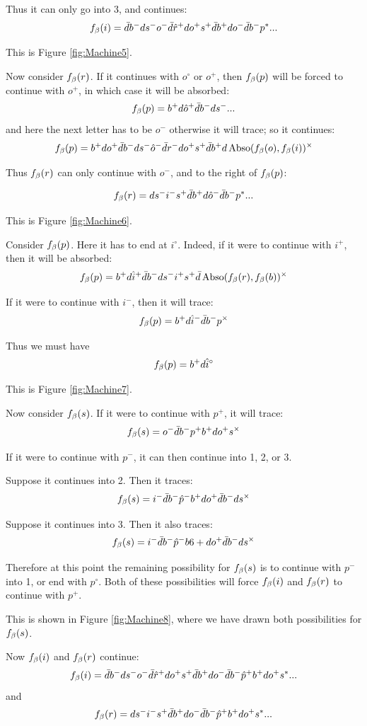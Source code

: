 Thus it can only go into 3, and continues:
\[
f_\beta(i) = \bar{d} b^- d s^- o^- \bar{d} \hat{r}^+ d o^+ s^+ \bar{d} b^+ d o^- \bar{d} b^- p^*...
\]

This is Figure \ref{fig:Machine5}.

Now consider $f_\beta(r)$. If it continues with $o^\circ$ or $o^+$, then $f_\beta(p)$ will be forced to continue with $o^+$, in which case it will be absorbed:
\[
f_\beta(p) = b^+ d \hat{o}^+ \bar{d} b^- d s^-...
\]
and here the next letter has to be $o^-$ otherwise it will trace; so it continues:
\[
f_\beta(p) = b^+ d o^+ \bar{d} b^- d s^- \hat{o}^- \bar{d} r^- d o^+ s^+ \bar{d} b^+ d \operatorname{Abso}(f_\beta(o), f_\beta(i))^\times
\]

Thus $f_\beta(r)$ can only continue with $o^-$, and to the right of $f_\beta(p)$:

\[
f_\beta(r) = d s^- i^- s^+ \bar{d} b^+ d \hat{o}^- \bar{d} b^- p^*...
\]

This is Figure \ref{fig:Machine6}.

Consider $f_\beta(p)$. Here it has to end at $i^\circ$. Indeed, if it were to continue with $i^+$, then it will be absorbed:
\[
f_\beta(p) = b^+ d \hat{i}^+ \bar{d} b^- d s^- i^+ s^+ \bar{d} \operatorname{Abso}(f_\beta(r), f_\beta(b))^\times
\]

If it were to continue with $i^-$, then it will trace:
\[
f_\beta(p) = b^+ d \hat{i}^- \bar{d} b^- p^\times
\]

Thus we must have
\[
f_\beta(p) = b^+ d \hat{i}^\circ
\]

This is Figure \ref{fig:Machine7}.

Now consider $f_\beta(s)$. If it were to continue with $p^+$, it will trace:
\[
f_\beta(s) = o^- \bar{d} b^- p^+ b^+ d o^+ s^\times
\]

If it were to continue with $p^-$, it can then continue into 1, 2, or 3. 

Suppose it continues into 2. Then it traces:
\[
f_\beta(s) = i^- \bar{d} b^- \hat{p}^- b^+ d o^+ \bar{d} b^- d s^\times
\]

Suppose it continues into 3. Then it also traces:
\[
f_\beta(s) = i^- \bar{d} b^- \hat{p}^- b6+ d o^+ \bar{d} b^- d s^\times
\]

Therefore at this point the remaining possibility for $f_\beta(s)$ is to continue with $p^-$ into 1, or end with $p^\circ$. Both of these possibilities will force $f_\beta(i)$ and $f_\beta(r)$ to continue with $p^+$. 

This is shown in Figure \ref{fig:Machine8}, where we have drawn both possibilities for $f_\beta(s)$.

Now $f_\beta(i)$ and $f_\beta(r)$ continue:
\[
f_\beta(i) = \bar{d} b^- d s^- o^- \bar{d} \hat{r}^+ d o^+ s^+ \bar{d} b^+ d o^- \bar{d} b^- \hat{p}^+ b^+ d o^+ s^*...
\]
and
\[
f_\beta(r) = d s^- i^- s^+ \bar{d} b^+ d o^- \bar{d} b^- \hat{p}^+ b^+ d o^+ s^*... 
\]

